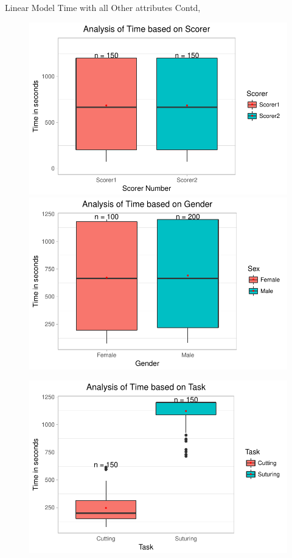 \documentclass{beamer}
\begin{document}
\begin{frame}{Linear Model}{ Time with all Other attributes Contd,}
\begin{figure}
	\begin{minipage}[c]{0.4\linewidth}
	\includegraphics[width=\linewidth]{ScorerVsTime.pdf}
	\end{minipage}
	\hfill
	\begin{minipage}[c]{0.4\linewidth}
	\includegraphics[width=\linewidth]{GenderVsTime.pdf}
	\end{minipage}
\end{figure}
\begin{figure}
	\begin{minipage}[c]{0.4\linewidth}
	\includegraphics[width=\linewidth]{TaskVsTime.pdf}

\end{minipage}
\end{figure}
\end{frame}
\end{document}
